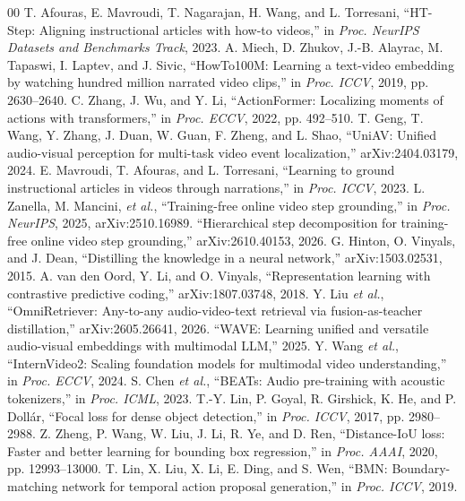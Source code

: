 \documentclass{IEEEtran}
\begin{document}
\begin{thebibliography}{00}
 T. Afouras, E. Mavroudi, T. Nagarajan, H. Wang, and L. Torresani, ``HT-Step: Aligning instructional articles with how-to videos,'' in \textit{Proc. NeurIPS Datasets and Benchmarks Track}, 2023.
 A. Miech, D. Zhukov, J.-B. Alayrac, M. Tapaswi, I. Laptev, and J. Sivic, ``HowTo100M: Learning a text-video embedding by watching hundred million narrated video clips,'' in \textit{Proc. ICCV}, 2019, pp. 2630--2640.
 C. Zhang, J. Wu, and Y. Li, ``ActionFormer: Localizing moments of actions with transformers,'' in \textit{Proc. ECCV}, 2022, pp. 492--510.
 T. Geng, T. Wang, Y. Zhang, J. Duan, W. Guan, F. Zheng, and L. Shao, ``UniAV: Unified audio-visual perception for multi-task video event localization,'' arXiv:2404.03179, 2024.
 E. Mavroudi, T. Afouras, and L. Torresani, ``Learning to ground instructional articles in videos through narrations,'' in \textit{Proc. ICCV}, 2023.
 L. Zanella, M. Mancini, \textit{et al.}, ``Training-free online video step grounding,'' in \textit{Proc. NeurIPS}, 2025, arXiv:2510.16989.
 ``Hierarchical step decomposition for training-free online video step grounding,'' arXiv:2610.40153, 2026.
 G. Hinton, O. Vinyals, and J. Dean, ``Distilling the knowledge in a neural network,'' arXiv:1503.02531, 2015.
 A. van den Oord, Y. Li, and O. Vinyals, ``Representation learning with contrastive predictive coding,'' arXiv:1807.03748, 2018.
 Y. Liu \textit{et al.}, ``OmniRetriever: Any-to-any audio-video-text retrieval via fusion-as-teacher distillation,'' arXiv:2605.26641, 2026.
 ``WAVE: Learning unified and versatile audio-visual embeddings with multimodal LLM,'' 2025.
 Y. Wang \textit{et al.}, ``InternVideo2: Scaling foundation models for multimodal video understanding,'' in \textit{Proc. ECCV}, 2024.
 S. Chen \textit{et al.}, ``BEATs: Audio pre-training with acoustic tokenizers,'' in \textit{Proc. ICML}, 2023.
 T.-Y. Lin, P. Goyal, R. Girshick, K. He, and P. Dollár, ``Focal loss for dense object detection,'' in \textit{Proc. ICCV}, 2017, pp. 2980--2988.
 Z. Zheng, P. Wang, W. Liu, J. Li, R. Ye, and D. Ren, ``Distance-IoU loss: Faster and better learning for bounding box regression,'' in \textit{Proc. AAAI}, 2020, pp. 12993--13000.
 T. Lin, X. Liu, X. Li, E. Ding, and S. Wen, ``BMN: Boundary-matching network for temporal action proposal generation,'' in \textit{Proc. ICCV}, 2019.

\end{thebibliography}
\end{document}
